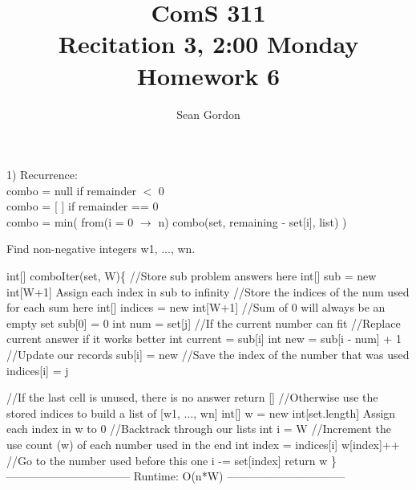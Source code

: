 \documentclass[12pt]{article}
\title{ComS 311\\Recitation 3, 2:00 Monday\\Homework 6}
\author{Sean Gordon}
\begin{document}
\maketitle


\pagebreak

1) Recurrence: \\
combo = null if remainder $<$ 0\\
combo = [ ] if remainder == 0\\
combo = min( from(i = 0 $\to$ n) {combo(set, remaining - set[i], list)} )\\


\begin{algorithm}[H]
\caption{Find non-negative integers w1, ..., wn.}
\begin{algorithmic} [1]
\State int[] comboIter(set, W)\{
\State 
\State //Store sub problem answers here
\State int[] sub = new int[W+1]
\State *Assign each index in sub to infinity
\State 
\State //Store the indices of the num used for each sum here
\State int[] indices = new int[W+1]
\State 
\State //Sum of 0 will always be an empty set
\State sub[0] = 0
\State 
{}
\State int num = set[j]
\State 
\State //If the current number can fit
\State //Replace current answer if it works better
\State int current = sub[i]
\State int new = sub[i - num] + 1
\State 
{}
\State //Update our records
\State sub[i] = new
\State //Save the index of the number that was used
\State indices[i] = j
\EndIf
\EndIf
\EndFor
\EndFor

\end{algorithmic}
\end{algorithm}


\begin{algorithm}                     
\begin{algorithmic} [1]


\State 
\State //If the last cell is unused, there is no answer
\State return []
\EndIf
\State 
\State 
\State //Otherwise use the stored indices to build a list of [w1, ..., wn]
\State int[] w = new int[set.length]
\State *Assign each index in w to 0
\State 
\State //Backtrack through our lists
\State int i = W
\State 
\State //Increment the use count (w) of each number used in the end
\State int index = indices[i]
\State w[index]++
\State 
\State //Go to the number used before this one
\State i -= set[index]
\EndWhile
\State 
\State return w
\State \}
\State 
\State --------------------------------- Runtime: O(n*W) --------------------------------
\end{algorithmic}
\end{algorithm}
\end{document}
